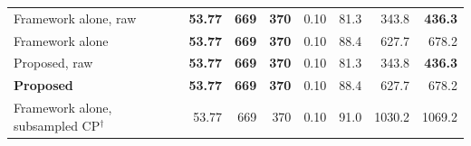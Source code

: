 \begin{table}[!tbp]
\begin{tabular}{lrrrrrrr}
Framework alone, raw & \textbf{53.77} & \textbf{669} & \textbf{370} & 0.10 & 81.3 & 343.8 & \textbf{436.3}\\
Framework alone & \textbf{53.77} & \textbf{669} & \textbf{370} & 0.10 & 88.4 & 627.7 & 678.2\\
Proposed, raw & \textbf{53.77} & \textbf{669} & \textbf{370} & 0.10 & 81.3 & 343.8 & \textbf{436.3}\\
\textbf{Proposed} & \textbf{53.77} & \textbf{669} & \textbf{370} & 0.10 & 88.4 & 627.7 & 678.2\\
Framework alone, subsampled CP$^\dagger$ & 53.77 & 669 & 370 & 0.10 & 91.0 & 1030.2 & 1069.2\\
\bottomrule
\end{tabular}
\end{table}